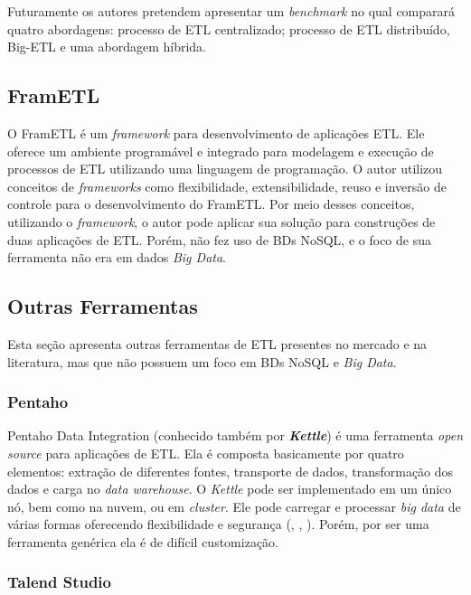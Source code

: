 Futuramente os autores pretendem apresentar um \textit{benchmark} no qual comparará quatro abordagens: processo de ETL centralizado; processo de ETL distribuído, Big-ETL e uma abordagem híbrida.

\subsection{FramETL}

O FramETL é um \textit{framework} para desenvolvimento de aplicações ETL. Ele oferece um ambiente programável e integrado para modelagem e execução de processos de ETL utilizando uma linguagem de programação. O autor utilizou conceitos de \textit{frameworks} como flexibilidade, extensibilidade, reuso e inversão de controle para o desenvolvimento do FramETL. Por meio desses conceitos, utilizando o \textit{framework}, o autor pode aplicar sua solução para construções de duas aplicações de ETL. Porém, \cite{silva:2012} não fez uso de BDs NoSQL, e o foco de sua ferramenta não era em dados \textit{Big Data}.

\subsection{Outras Ferramentas}

Esta seção apresenta outras ferramentas de ETL presentes no mercado e na literatura, mas que não possuem um foco em BDs NoSQL e \textit{Big Data}.
\subsubsection{Pentaho}

Pentaho Data Integration (conhecido também por \textit{\textbf{Kettle}}) é uma ferramenta \textit{open source} para aplicações de ETL. Ela é composta basicamente por quatro elementos: extração de diferentes fontes, transporte de dados, transformação dos dados e carga no \textit{data warehouse}. O \textit{Kettle} pode ser implementado em um único nó, bem como na nuvem, ou em \textit{cluster}. Ele pode carregar e processar \textit{big data} de várias formas oferecendo flexibilidade e segurança (\cite{mali:2015}, \cite{ETLtools}, \cite{pentaho}). Porém, por ser uma ferramenta genérica ela é de difícil customização. 

\subsubsection{Talend Studio}

